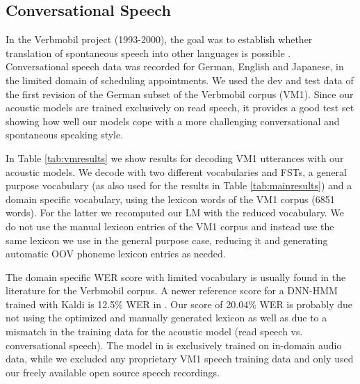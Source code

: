 \documentclass[a4paper]{article}
\begin{document}
\subsection{Conversational Speech}

In the Verbmobil project (1993-2000), the goal was to establish whether translation of spontaneous speech into other languages is possible \cite{wahlster2013verbmobil}. Conversational speech data was recorded for German, English and Japanese, in the limited domain of scheduling appointments. We used the dev and test data of the first revision of the German subset of the Verbmobil corpus (VM1). Since our acoustic models are trained exclusively on read speech, it provides a good test set showing how well our models cope with a more challenging conversational and spontaneous speaking style.

In Table \ref{tab:vmresults} we show results for decoding VM1 utterances with our acoustic models. We decode with two different vocabularies and FSTs, a general purpose vocabulary (as also used for the results in Table \ref{tab:mainresults}) and a domain specific vocabulary, using the lexicon words of the VM1 corpus (6851 words). For the latter we recomputed our LM with the reduced vocabulary. We do not use the manual lexicon entries of the VM1 corpus and instead use the same lexicon we use in the general purpose case, reducing it and generating automatic OOV phoneme lexicon entries as needed.

The domain specific WER score with limited vocabulary is usually found in the literature for the Verbmobil corpus. A newer reference score for a DNN-HMM trained with Kaldi is 12.5\% WER in \cite{gaida2014comparing}. Our score of 20.04\% WER is probably due not using the optimized and manually generated lexicon as well as due to a mismatch in the training data for the acoustic model (read speech vs. conversational speech). The model in \cite{gaida2014comparing} is exclusively trained on in-domain audio data, while we excluded any proprietary VM1 speech training data and only used our freely available open source speech recordings.
\end{document}
